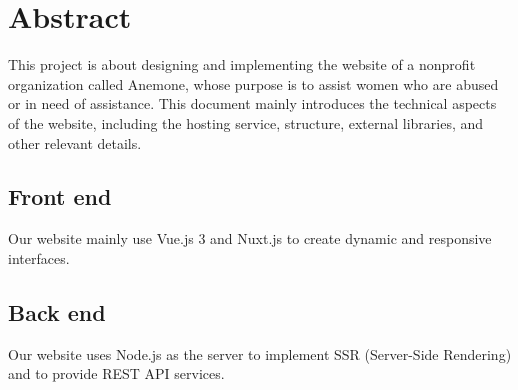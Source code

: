\section{Abstract}
This project is about designing and implementing the website of a nonprofit organization called Anemone,
whose purpose is to assist women who are abused or in need of assistance. This document mainly introduces the technical aspects of the website, including the hosting service, structure, external libraries, and other relevant details.
\subsection{Front end}
Our website mainly use Vue.js 3 and Nuxt.js to create dynamic and responsive interfaces.
\subsection{Back end}
Our website uses Node.js as the server to implement SSR (Server-Side Rendering) and to provide REST API services.
